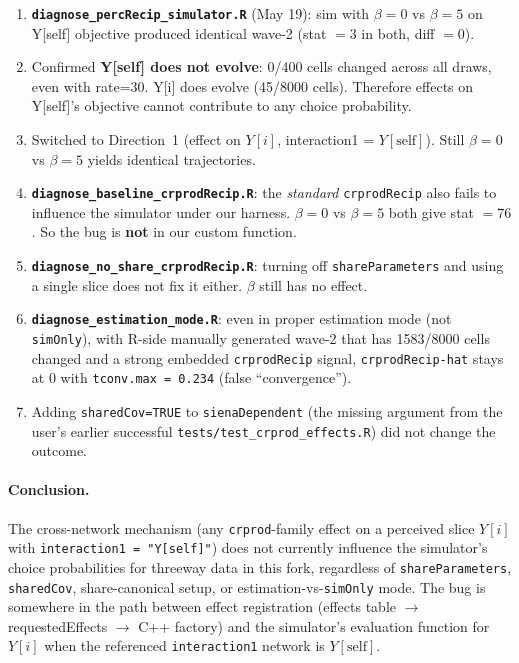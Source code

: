 \documentclass[11pt]{article}
\newcommand{\self}{\mathrm{self}}
\newcommand{\file}[1]{\texttt{#1}}
\begin{document}
\begin{enumerate}[leftmargin=*]
  \item \textbf{\file{diagnose\_percRecip\_simulator.R}} (May 19):
        sim with $\beta\!=\!0$ vs $\beta\!=\!5$ on Y[self] objective
        produced identical wave-2 (stat $=3$ in both, diff $=0$).
  \item Confirmed \textbf{Y[self] does not evolve}: 0/400 cells changed
        across all draws, even with rate=30.  Y[i] does evolve
        (45/8000 cells).  Therefore effects on Y[self]'s objective
        cannot contribute to any choice probability.
  \item Switched to Direction~1 (effect on $Y[i]$, interaction1 =
        $Y[\self]$).  Still $\beta\!=\!0$ vs $\beta\!=\!5$ yields
        identical trajectories.
  \item \textbf{\file{diagnose\_baseline\_crprodRecip.R}}: the
        \emph{standard} \texttt{crprodRecip} also fails to influence
        the simulator under our harness.  $\beta\!=\!0$ vs
        $\beta\!=\!5$ both give stat $=76$.  So the bug is
        \textbf{not} in our custom function.
  \item \textbf{\file{diagnose\_no\_share\_crprodRecip.R}}: turning
        off \texttt{shareParameters} and using a single slice does
        not fix it either.  $\beta$ still has no effect.
  \item \textbf{\file{diagnose\_estimation\_mode.R}}: even in proper
        estimation mode (not \texttt{simOnly}), with R-side manually
        generated wave-2 that has 1583/8000 cells changed and a
        strong embedded \texttt{crprodRecip} signal,
        \texttt{crprodRecip-hat} stays at $0$ with \texttt{tconv.max
        = 0.234} (false ``convergence'').
  \item Adding \texttt{sharedCov=TRUE} to \texttt{sienaDependent}
        (the missing argument from the user's earlier successful
        \file{tests/test\_crprod\_effects.R}) did not change the
        outcome.
\end{enumerate}

\paragraph{Conclusion.}
The cross-network mechanism (any \texttt{crprod}-family effect on a
perceived slice $Y[i]$ with \texttt{interaction1 = "Y[self]"}) does not
currently influence the simulator's choice probabilities for threeway
data in this fork, regardless of \texttt{shareParameters},
\texttt{sharedCov}, share-canonical setup, or
estimation-vs-\texttt{simOnly} mode.  The bug is somewhere in the path
between effect registration (effects table $\to$ requestedEffects
$\to$ C++ factory) and the simulator's evaluation function for $Y[i]$
when the referenced \texttt{interaction1} network is $Y[\self]$.
\end{document}
